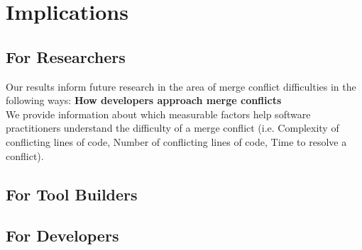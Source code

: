 \section{Implications}\label{implications}
\subsection{For Researchers}
Our results inform future research in the area of merge conflict difficulties in the following ways:
\textbf{How developers approach merge conflicts}\\
We provide information about which measurable factors help software practitioners understand the difficulty of a merge conflict (i.e. Complexity of conflicting lines of code, Number of conflicting lines of code, Time to resolve a conflict). 
\subsection{For Tool Builders}
\subsection{For Developers}